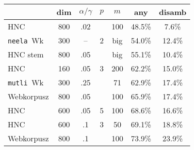 \documentclass{beamer}
\newcommand{\neela}{\texttt{neela}}
\newcommand{\mutli}{\texttt{mutli}}
\begin{document}
\begin{frame}
  \begin{table}
    \begin{tabular}{lcccc|cc}
      \toprule
        & dim & $\alpha/\gamma$ & $p$ & $m$ & any & disamb \\
        \midrule
        HNC	        & 800	& .02	&       & 100   & 48.5\%	&  7.6\% \\
        \neela~Wk&300&--&2   &big  & 54.0\%	&  12.4\% \\
        HNC stem & 800	& .05	&       &  big & 55.1\%	&  10.4\% \\
        HNC         & 160 & .05 & 3     & 200   & 62.2\%	&  15.0\% \\
        \mutli~Wk &300&.25 &       & 71    & 62.9\%	&  17.4\% \\
        Webkorpusz	    & 800	& .05	&       & 100	  & 65.9\%	&  17.4\% \\
        HNC	        & 600	& .05	& 5     & 100	  & 68.6\%	&  16.6\% \\
        HNC	        & 600	& .1  & 3     & 50	  & 69.1\%	&  18.8\% \\
        Webkorpusz	    & 800	& .1  &       & 100	  & 73.9\%	&  23.9\% \\
        \bottomrule
    \end{tabular}
  \end{table}
\end{frame}
\end{document}
